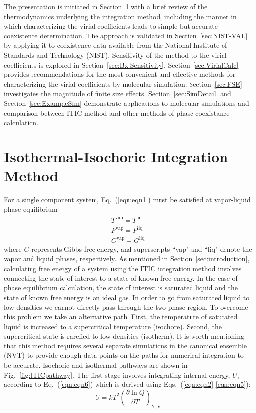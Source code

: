 \documentclass[%
 aip,
 jcp,
 sd,%
 amsmath,amssymb,
 reprint,%
]{revtex4-1}
\begin{document}
The presentation is initiated in Section~\ref{sec:ITIC-method} with a brief review of the thermodynamics underlying the integration method, including the manner in which characterizing the virial coefficients leads to simple but accurate coexistence determination. The approach is validated in Section~\ref{sec:NIST-VAL} by applying it to coexistence data available from the National Institute of Standards and Technology (NIST). Sensitivity of the method to the virial coefficients is explored in Section~\ref{sec:Bx-Sensitivity}. Section~\ref{sec:VirialCalc} provides recommendations for the most convenient and effective methods for characterizing the virial coefficients by molecular simulation. 
Section~\ref{sec:FSE} investigates the magnitude of finite size effects. 
Section~\ref{sec:SimDetail} and Section~\ref{sec:ExampleSim} demonstrate applications to molecular simulations and comparison between ITIC method and other methods of phase coexistance calculation.

\section{Isothermal-Isochoric Integration Method} \label{sec:ITIC-method}
For a single component system, Eq.~(\ref{eqn:eqn1}) must be satisfied at vapor-liquid phase equilibrium
\begin{equation}
\begin{array}{l} {T^{\mathrm{vap}} =T^{\mathrm{liq}} } \\ {P^{\mathrm{vap}} =P^{\mathrm{liq}} } \\ {G^{\mathrm{vap}} =G^{\mathrm{liq}} } \end{array} \label{eqn:eqn1}
\end{equation}
where $G$ represents Gibbs free energy, and superscripts ``vap" and ``liq" denote the vapor and liquid phases, respectively. As mentioned in Section~\ref{sec:introduction}, calculating free energy of a system using the ITIC integration method involves connecting the state of interest to a state of known free energy. In the case of phase equilibrium calculation, the state of interest is saturated liquid and the state of known free energy is an ideal gas. In order to go from saturated liquid to low densities we cannot directly pass through the two phase region. To overcome this problem we take an alternative path. First, the temperature of saturated liquid is increased to a supercritical temperature (isochore). Second, the supercritical state is rarefied to low densities (isotherm). It is worth mentioning that this method requires several separate simulations in the canonical ensemble (NVT) to provide enough data points on the paths for numerical integration to be accurate. Isochoric and isothermal pathways are shown in Fig.~\ref{fig:ITICpathway}. The first stage involves integrating internal energy, $U$, according to Eq.~(\ref{eqn:eqn6}) which is derived using Eqs.~(\ref{eqn:eqn2}-\ref{eqn:eqn5}):
\begin{equation}
U=kT^{2} \left( \frac{\partial \ln Q}{\partial T}\right) _{\mathrm N,\mathrm V}  \label{eqn:eqn2}
\end{equation}
\end{document}
